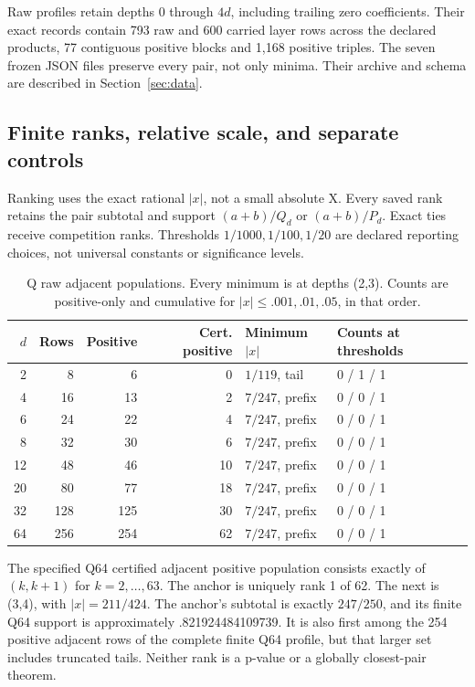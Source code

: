 \documentclass[11pt,a4paper]{article}
\begin{document}
Raw profiles retain depths 0 through $4d$, including trailing zero coefficients. Their exact records contain 793 raw and 600 carried layer rows across the declared products, 77 contiguous positive blocks and 1,168 positive triples. The seven frozen JSON files preserve every pair, not only minima. Their archive and schema are described in Section~\ref{sec:data}.

\clearpage
\subsection{Finite ranks, relative scale, and separate controls}
\label{sec:ranks}
Ranking uses the exact rational $|x|$, not a small absolute X. Every saved rank retains the pair subtotal and support $(a+b)/Q_d$ or $(a+b)/P_d$. Exact ties receive competition ranks. Thresholds $1/1000,1/100,1/20$ are declared reporting choices, not universal constants or significance levels.

\begin{table}[ht]
\centering\small
\begin{tabular}{@{}rrrrll@{}}\toprule
$d$ & Rows & Positive & Cert. positive & Minimum $|x|$ & Counts at thresholds\\\midrule
2 & 8 & 6 & 0 & $1/119$, tail & 0 / 1 / 1\\
4 & 16 & 13 & 2 & $7/247$, prefix & 0 / 0 / 1\\
6 & 24 & 22 & 4 & $7/247$, prefix & 0 / 0 / 1\\
8 & 32 & 30 & 6 & $7/247$, prefix & 0 / 0 / 1\\
12 & 48 & 46 & 10 & $7/247$, prefix & 0 / 0 / 1\\
20 & 80 & 77 & 18 & $7/247$, prefix & 0 / 0 / 1\\
32 & 128 & 125 & 30 & $7/247$, prefix & 0 / 0 / 1\\
64 & 256 & 254 & 62 & $7/247$, prefix & 0 / 0 / 1\\\bottomrule
\end{tabular}
\caption{Q raw adjacent populations. Every minimum is at depths (2,3). Counts are positive-only and cumulative for $|x|\le.001,.01,.05$, in that order.}
\label{tab:ranks}
\end{table}
The specified Q64 certified adjacent positive population consists exactly of $(k,k+1)$ for $k=2,\ldots,63$. The anchor is uniquely rank 1 of 62. The next is (3,4), with $|x|=211/424$. The anchor's subtotal is exactly $247/250$, and its finite Q64 support is approximately .821924484109739. It is also first among the 254 positive adjacent rows of the complete finite Q64 profile, but that larger set includes truncated tails. Neither rank is a p-value or a globally closest-pair theorem.
\end{document}
